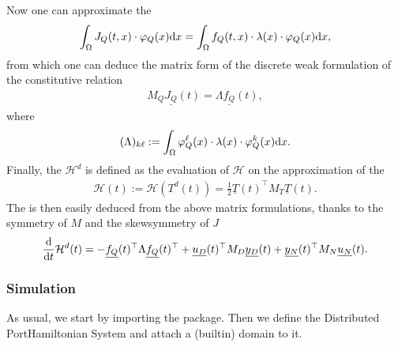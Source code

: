 \documentclass[letterpaper,10pt,english]{sphinxmanual}
\begin{document}
\sphinxAtStartPar
Now one can approximate the 
\begin{equation*}
\begin{split}\int_\Omega J_Q(t,x) \cdot \varphi_Q(x) {\rm d}x = \int_\Omega f_Q(t,x) \cdot \lambda(x) \cdot \varphi_Q(x) {\rm d}x,\end{split}
\end{equation*}
\sphinxAtStartPar
from which one can deduce the matrix form of the discrete weak
formulation of the constitutive relation
\begin{equation*}
\begin{split}M_Q \underline{J_Q}(t) = \Lambda \underline{f_Q}(t),\end{split}
\end{equation*}
\sphinxAtStartPar
where
\begin{equation*}
\begin{split}(\Lambda)_{k\ell} := \int_\Omega \varphi_Q^\ell(x) \cdot \lambda(x) \cdot \varphi_Q^k(x) {\rm d}x.\end{split}
\end{equation*}
\sphinxAtStartPar
Finally, the  \(\mathcal{H}^d\) is defined
as the evaluation of \(\mathcal{H}\) on the approximation of the
\begin{equation*}
\begin{split}\mathcal{H}(t) := \mathcal{H}(T^d(t)) = \frac{1}{2} \underline{T}(t)^\top M_T \underline{T}(t).\end{split}
\end{equation*}
\sphinxAtStartPar
The  is then easily deduced from the above
matrix formulations, thanks to the symmetry of \(M\) and the
skew\sphinxhyphen{}symmetry of \(J\)
\begin{equation*}
\begin{split}\frac{\rm d}{{\rm d}t} \mathcal{H}^d(t) = - \underline{f_Q}(t)^\top \Lambda \underline{f_Q}(t)^\top + \underline{u_D}(t)^\top M_D \underline{y_D}(t) + \underline{y_N}(t)^\top M_N \underline{u_N}(t).\end{split}
\end{equation*}

\subsubsection{Simulation}
\label{\detokenize{examples/heat:simulation}}
\sphinxAtStartPar
As usual, we start by importing the  package. Then we define
the Distributed Port\sphinxhyphen{}Hamiltonian System and attach a (built\sphinxhyphen{}in) domain
to it.
\end{document}
